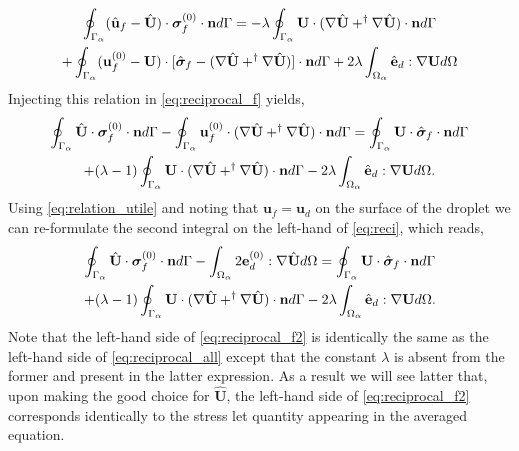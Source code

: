 \begin{multline}
    \oint_{\Gamma_{\alpha}} (\hat{\textbf{u}}_f - \hat{\textbf{U}})\cdot \bm\sigma_f^{(0)} \cdot \textbf{n} d\Gamma
    =
    - \lambda\oint_{\Gamma_{\alpha}}   \textbf{U} \cdot (\mathbf{\nabla} \hat{\textbf{U}} + ^\dagger\mathbf{\nabla} \hat{\textbf{U}})  \cdot \textbf{n} d\Gamma\\
    + \oint_{\Gamma_{\alpha}} (\textbf{u}_f^{(0)} - \textbf{U}) \cdot  [\hat{\bm\sigma}_f -(\mathbf{\nabla} \hat{\textbf{U}} + ^\dagger\mathbf{\nabla} \hat{\textbf{U}})]\cdot \textbf{n}  d\Gamma
    + 2\lambda\int_{\Omega_{\alpha}} \hat{\textbf{e}}_d : \mathbf{\nabla} \textbf{U} d\Omega 
\end{multline}
Injecting this relation in \ref{eq:reciprocal_f} yields, 
\begin{multline}
    \intS{\hat{\textbf{U}}\cdot  \bm\sigma_f^{(0)} \cdot \textbf{n}}
    - \intS{\textbf{u}_f^{(0)}\cdot  (\grad \hat{\textbf{U}} + ^\dagger\grad \hat{\textbf{U}})\cdot \textbf{n} }
    = 
    \intS{\textbf{U}\cdot  \hat{\bm\sigma}_f \cdot \textbf{n}}\\
    + (\lambda - 1)\intS{  \textbf{U} \cdot (\grad \hat{\textbf{U}} + ^\dagger\grad \hat{\textbf{U}})  \cdot \textbf{n}}
    - 2\lambda\intO{\hat{\textbf{e}}_d : \grad \textbf{U}}. 
    \label{eq:reci}
\end{multline}
Using \ref{eq:relation_utile} and noting that $\textbf{u}_f = \textbf{u}_d$ on the surface of the droplet we can re-formulate the second integral on the left-hand of \ref{eq:reci}, which reads,  
\begin{multline}
    \intS{\hat{\textbf{U}}\cdot  \bm\sigma_f^{(0)} \cdot \textbf{n}}
    - \intO{ 2\textbf{e}_d^{(0)} : \grad \hat{\textbf{U}} }
    = 
    \intS{\textbf{U}\cdot  \hat{\bm\sigma}_f \cdot \textbf{n}}\\
    + (\lambda - 1)\intS{  \textbf{U} \cdot (\grad \hat{\textbf{U}} + ^\dagger\grad \hat{\textbf{U}})  \cdot \textbf{n}}
    - 2\lambda\intO{\hat{\textbf{e}}_d : \grad \textbf{U}}. 
    \label{eq:reciprocal_f2}
\end{multline}
Note that the left-hand side of \ref{eq:reciprocal_f2} is identically the same as the left-hand side of \ref{eq:reciprocal_all} except that the constant $\lambda$ is absent from the former and present in the latter expression. 
As a result we will see latter that, upon making the good choice for $\hat{\textbf{U}}$, the left-hand side of \ref{eq:reciprocal_f2} corresponds identically to the stress let quantity appearing in the averaged equation. 


